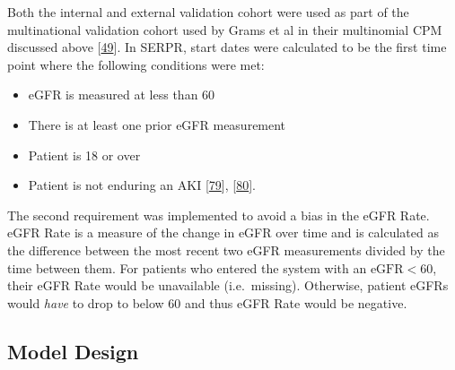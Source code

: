 \documentclass[12pt,PhD,twoside,openright]{muthesis}
\providecommand{\tightlist}{%
  \setlength{\itemsep}{0pt}\setlength{\parskip}{0pt}}
\begin{document}
Both the internal and external validation cohort were used as part of the multinational validation cohort used by Grams et al in their multinomial CPM discussed above {[}\protect\hyperlink{ref-grams_predicting_2018}{49}{]}. In SERPR, start dates were calculated to be the first time point where the following conditions were met:
\begin{itemize}
\tightlist
\item
  eGFR is measured at less than 60
\item
  There is at least one prior eGFR measurement
\item
  Patient is 18 or over
\item
  Patient is not enduring an AKI {[}\protect\hyperlink{ref-forni_renal_2017-1}{79}{]}, {[}\protect\hyperlink{ref-noauthor_kdigo_2012}{80}{]}.
\end{itemize}
The second requirement was implemented to avoid a bias in the eGFR Rate. eGFR Rate is a measure of the change in eGFR over time and is calculated as the difference between the most recent two eGFR measurements divided by the time between them. For patients who entered the system with an \(\textrm{eGFR} < 60\), their eGFR Rate would be unavailable (i.e.~missing). Otherwise, patient eGFRs would \emph{have} to drop to below 60 and thus eGFR Rate would be negative.

\hypertarget{model-design}{%
\subsection{Model Design}\label{model-design}}
\end{document}
